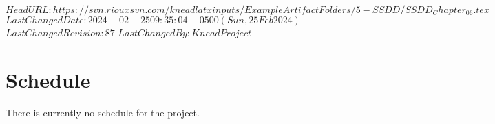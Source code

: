 \svnidlong
{$HeadURL: https://svn.riouxsvn.com/kneadlatxinputs/ExampleArtifactFolders/5-SSDD/SSDD_Chapter_06.tex $}
{$LastChangedDate: 2024-02-25 09:35:04 -0500 (Sun, 25 Feb 2024) $}
{$LastChangedRevision: 87 $}
{$LastChangedBy: KneadProject $}

\chapter{Schedule}
\label{loc:Schedule}

There is currently no schedule for the \ThisSystem project.

